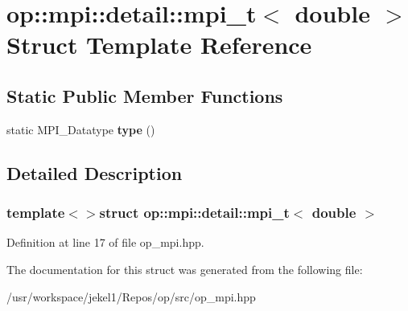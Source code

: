 \hypertarget{structop_1_1mpi_1_1detail_1_1mpi__t_3_01double_01_4}{\section{op\-:\-:mpi\-:\-:detail\-:\-:mpi\-\_\-t$<$ double $>$ Struct Template Reference}
\label{structop_1_1mpi_1_1detail_1_1mpi__t_3_01double_01_4}
}
\subsection*{Static Public Member Functions}
\begin{DoxyCompactItemize}
\item 
\hypertarget{structop_1_1mpi_1_1detail_1_1mpi__t_3_01double_01_4_ab700721841d0f23c664786c849725add}{static M\-P\-I\-\_\-\-Datatype {\bfseries type} ()}\label{structop_1_1mpi_1_1detail_1_1mpi__t_3_01double_01_4_ab700721841d0f23c664786c849725add}

\end{DoxyCompactItemize}


\subsection{Detailed Description}
\subsubsection*{template$<$$>$struct op\-::mpi\-::detail\-::mpi\-\_\-t$<$ double $>$}



Definition at line 17 of file op\-\_\-mpi.\-hpp.



The documentation for this struct was generated from the following file\-:\begin{DoxyCompactItemize}
\item 
/usr/workspace/jekel1/\-Repos/op/src/op\-\_\-mpi.\-hpp\end{DoxyCompactItemize}
